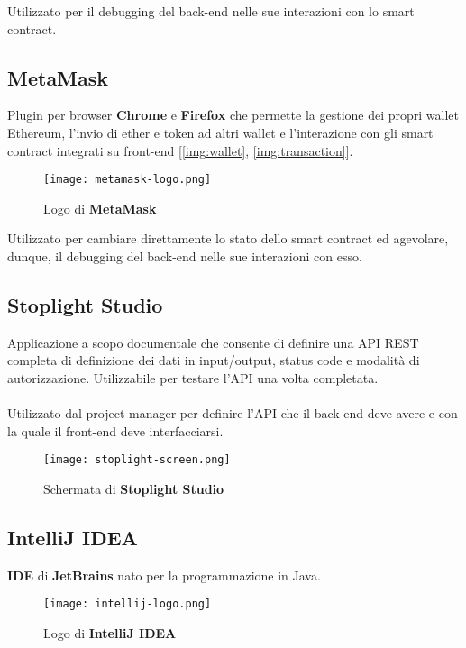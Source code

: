     Utilizzato per il debugging del back-end nelle sue interazioni con lo smart contract.

    \subsection{MetaMask}
    Plugin per browser \textbf{Chrome} e \textbf{Firefox} che permette la gestione dei propri wallet Ethereum, l'invio di ether e token ad altri wallet e l'interazione con gli smart contract integrati su front-end [\autoref{img:wallet}, \autoref{img:transaction}].

    \begin{figure}[h!]
        \centering
        \texttt{[image: metamask-logo.png]}
        \caption{Logo di \textbf{MetaMask}}
    \end{figure}

    Utilizzato per cambiare direttamente lo stato dello smart contract ed agevolare, dunque, il debugging del back-end nelle sue interazioni con esso.

    \subsection{Stoplight Studio}
    Applicazione a scopo documentale che consente di definire una API REST completa di definizione dei dati in input/output, status code e modalità di autorizzazione. Utilizzabile per testare l'API una volta completata.
    \\\\
    Utilizzato dal project manager per definire l'API che il back-end deve avere e con la quale il front-end deve interfacciarsi.

    \begin{figure}[h!]
        \centering
        \hspace*{-1cm}
        \texttt{[image: stoplight-screen.png]}
        \caption{Schermata di \textbf{Stoplight Studio}}
    \end{figure}

\newpage

    \subsection{IntelliJ IDEA}
    \textbf{IDE} di \textbf{JetBrains} nato per la programmazione in Java.\\

    \begin{figure}[h!]
        \centering
        \texttt{[image: intellij-logo.png]}
        \caption{Logo di \textbf{IntelliJ IDEA}}
    \end{figure}


